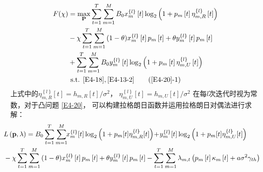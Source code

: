 \begin{align} \notag
F(\chi)&=  \max _{ \mathbf{P}} \sum_{t=1}^T \sum_{m=1}^M {B}_{0}x_{m}^{\left\{ l \right\}}\left[ t \right] %
\log_2{\left(1+p_m\left[t\right]\eta_{m,R}^{\left\{ l \right\}}\left[t\right]\right)}                         \\       \label{E4-20}
& -\chi \sum_{t=1}^T \sum_{m=1}^M{(1-\theta)x_{m}^{\left\{ l \right\}}\left[ t \right]p_m\left[t\right]
+\theta y_{m}^{\left\{ l \right\}}\left[ t \right]p_m\left[t\right]}                                                           \\ \notag
& + \sum_{t=1}^T \sum_{m=1}^M {B}_{0}y_{m}^{\left\{ l \right\}}\left[ t \right]
\log_2{\left(1+p_m\left[t\right]\eta_{m,U}^{\left\{ l \right\}}\left[t\right]\right)}                                          \\ \notag
&\text { s.t. }
\eqref{E4-18},\eqref{E4-13-2}                                                           \tag{\ref{E4-20}{-1}}       \label{E4-20-1}
\end{align}
上式中的$\eta_{m,R}^{\left\{ l \right\}}\left[t\right]=h_{m,R}\left[t\right]/{\sigma^2}$，
$\eta_{m,U}^{\left\{ l \right\}}\left[t\right]=h_{m,U}\left[t\right]/{\sigma^2}$
在每$l$次迭代时视为常数，对于凸问题 \eqref{E4-20}，
可以构建拉格朗日函数并运用拉格朗日对偶法进行求解：
\begin{align} \label{E4-21}
&\!\!\!\!\!\!L\left(\mathbf{p},\lambda\right)=B_{0}\sum_{t=1}^{T} \sum_{m=1}^{M}  \!\! x_{m}^{\{ l \}}[t] \log_{2}\left(1 + p_{m}[t]\eta_{m,R}^{\{ l \}}[t]\right) \! +\!  y_{m}^{\{ l \}}[t] \log_{2}\left(1 + p_{m}[t]\eta_{m,U}^{\{ l \}}[t]\right)  \\
&\!\!\!\!\!\!-\chi \sum_{t=1}^T \sum_{m=1}^M{(1-\theta)x_{m}^{\left\{ l \right\}}\left[ t \right]p_m\left[t\right]
+\theta y_{m}^{\left\{ l \right\}}\left[ t \right]p_m\left[t\right]} %
-\sum\limits_{t=1}^{T}{\sum\limits_{m=1}^{M}{{{\lambda }_{m,t}}}}\left( {{p}_{m}}\left[ t \right]{{\kappa }_{m}}\left[ t \right]+a{{\sigma }^{2}}{{\gamma }_{th}} \right) \notag
\end{align}

